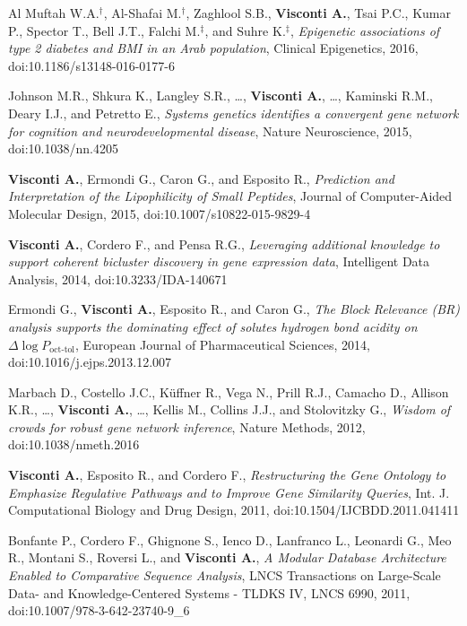 \documentclass[a4paper,10pt]{article}
\begin{document}
{\begin{itemize}
		 Al Muftah W.A.$^{\textbf{$\dag $}}$, Al-Shafai M.$^{\textbf{$\dag $}}$, Zaghlool S.B., \textbf{Visconti A.}, Tsai P.C., Kumar P., Spector T., Bell J.T., Falchi M.$^{\textbf{$\ddag $}}$, and Suhre K.$^{\textbf{$\ddag $}}$, \emph{Epigenetic associations of type 2 diabetes and BMI in an Arab population}, Clinical Epigenetics, 2016, doi:10.1186/s13148-016-0177-6

		 Johnson M.R., Shkura K., Langley S.R., \dots, \textbf{Visconti A.}, \dots, Kaminski R.M., Deary I.J., and Petretto E., \emph{Systems genetics identifies a convergent gene network for cognition and neurodevelopmental disease}, Nature Neuroscience, 2015, doi:10.1038/nn.4205

		 \textbf{Visconti A.}, Ermondi G., Caron G., and Esposito R., \emph{Prediction and Interpretation of the Lipophilicity of Small Peptides}, Journal of Computer-Aided Molecular Design, 2015, doi:10.1007/s10822-015-9829-4

		 \textbf{Visconti A.}, Cordero F., and Pensa R.G., \emph{Leveraging additional knowledge to support coherent bicluster discovery in gene expression data}, Intelligent Data Analysis, 2014, doi:10.3233/IDA-140671

		 Ermondi G., \textbf{Visconti A.}, Esposito R., and Caron G., \emph{The Block Relevance (BR) analysis supports the dominating effect of solutes hydrogen bond acidity on $\Delta \log P_{\text{oct-tol}}$}, European Journal of Pharmaceutical Sciences, 2014, doi:10.1016/j.ejps.2013.12.007

		 Marbach D., Costello J.C., K\"{u}ffner R., Vega N., Prill R.J., Camacho D., Allison K.R., \dots, \textbf{Visconti A.}, \dots, Kellis M., Collins J.J., and Stolovitzky G., \emph{Wisdom of crowds for robust gene network inference}, Nature Methods, 2012, doi:10.1038/nmeth.2016

		 \textbf{Visconti A.}, Esposito R., and Cordero F., \emph{Restructuring the Gene Ontology to Emphasize Regulative Pathways and to Improve Gene Similarity Queries}, Int. J. Computational Biology and Drug Design, 2011, doi:10.1504/IJCBDD.2011.041411

		 Bonfante P., Cordero F., Ghignone S., Ienco D., Lanfranco L., Leonardi G., Meo R., Montani S., Roversi L., and \textbf{Visconti A.}, \emph{A Modular Database Architecture Enabled to Comparative Sequence Analysis}, LNCS Transactions on Large-Scale Data- and Knowledge-Centered Systems - TLDKS IV, LNCS 6990, 2011, doi:10.1007/978-3-642-23740-9\_6
 	\end{itemize}
}
\end{document}
